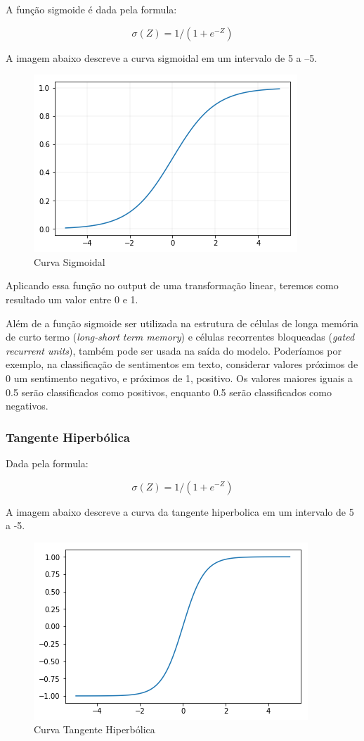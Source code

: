 \documentclass[12pt]{article}
\begin{document}
A função sigmoide é dada pela formula:

\begin{equation}
    \sigma(Z) = 1/(1+e^{-Z})
\end{equation}

A imagem abaixo descreve a curva sigmoidal em um intervalo de 5 a –5.

\begin{figure}[!htb]
\centering
\includegraphics[width=.5\textwidth]{images/sigmoid.png}
\caption{Curva Sigmoidal}
\label{fig:sigmoid}
\end{figure}

Aplicando essa função no output de uma transformação linear, teremos como resultado um valor entre 0 e 1.

Além de a função sigmoide ser utilizada na estrutura de células de longa memória de curto termo (\textit{long-short term memory}) e células recorrentes bloqueadas (\textit{gated recurrent units}), também pode ser usada na saída do modelo. Poderíamos por exemplo, na classificação de sentimentos em texto, considerar valores próximos de 0 um sentimento negativo, e próximos de 1, positivo. Os valores maiores iguais a 0.5 serão classificados como positivos, enquanto 0.5 serão classificados como negativos.

\subsubsection{Tangente Hiperbólica}

Dada pela formula: 

\begin{equation}
    \sigma(Z) = 1/(1+e^{-Z})
\end{equation}

A imagem abaixo descreve a curva da tangente hiperbolica em um intervalo de 5 a -5.

\begin{figure}[!htb]
\centering
\includegraphics[width=.5\textwidth]{images/tanh.png}
\caption{Curva Tangente Hiperbólica}
\label{fig:tanh}
\end{figure}
\end{document}
